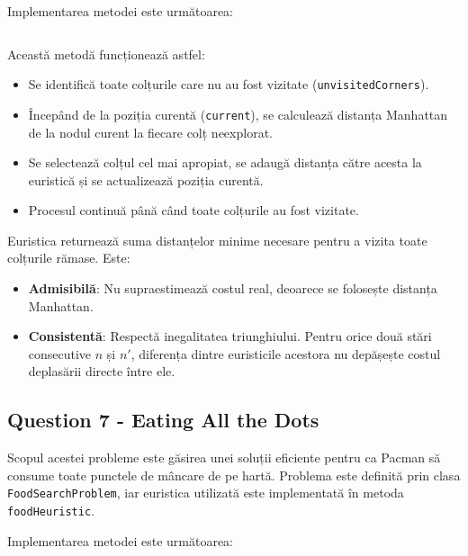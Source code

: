 \par Implementarea metodei este următoarea:
\inputminted[linenos]{python}{code/corners_heuristic.py}

\par Această metodă funcționează astfel:
\begin{itemize}
	\item Se identifică toate colțurile care nu au fost vizitate (\texttt{unvisitedCorners}).
	\item Începând de la poziția curentă (\texttt{current}), se calculează distanța Manhattan de la nodul curent la fiecare colț neexplorat.
	\item Se selectează colțul cel mai apropiat, se adaugă distanța către acesta la euristică și se actualizează poziția curentă.
	\item Procesul continuă până când toate colțurile au fost vizitate.
\end{itemize}

\par Euristica returnează suma distanțelor minime necesare pentru a vizita toate colțurile rămase. Este:
\begin{itemize}
	\item \textbf{Admisibilă}: Nu supraestimează costul real, deoarece se folosește distanța Manhattan.
	\item \textbf{Consistentă}: Respectă inegalitatea triunghiului. Pentru orice două stări consecutive \( n \) și \( n' \), diferența dintre euristicile acestora nu depășește costul deplasării directe între ele.
\end{itemize}

\subsection{Question 7 - Eating All the Dots}
\par Scopul acestei probleme este găsirea unei soluții eficiente pentru ca Pacman să consume toate punctele de mâncare de pe hartă. Problema este definită prin clasa \texttt{FoodSearchProblem}, iar euristica utilizată este implementată în metoda \texttt{foodHeuristic}.

\par Implementarea metodei este următoarea:
\inputminted[linenos]{python}{code/eating_all_the_dots.py}

